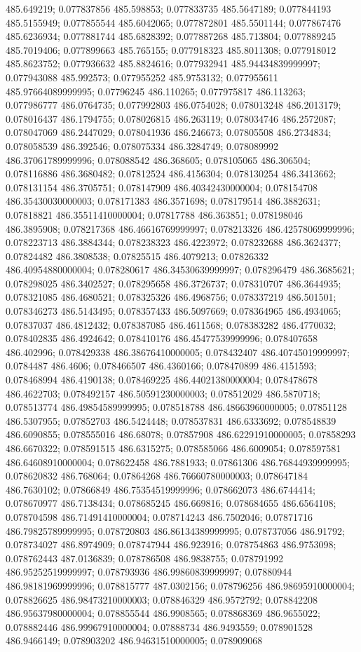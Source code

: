 485.649219; 0.077837856 485.598853; 0.077833735 485.5647189; 0.077844193 485.5155949; 0.077855544 485.6042065; 0.077872801 485.5501144; 0.077867476 485.6236934; 0.077881744 485.6828392; 0.077887268 485.713804; 0.077889245 485.7019406; 0.077899663 485.765155; 0.077918323 485.8011308; 0.077918012 485.8623752; 0.077936632 485.8824616; 0.077932941 485.94434839999997; 0.077943088 485.992573; 0.077955252 485.9753132; 0.077955611 485.97664089999995; 0.07796245 486.110265; 0.077975817 486.113263; 0.077986777 486.0764735; 0.077992803 486.0754028; 0.078013248 486.2013179; 0.078016437 486.1794755; 0.078026815 486.263119; 0.078034746 486.2572087; 0.078047069 486.2447029; 0.078041936 486.246673; 0.07805508 486.2734834; 0.078058539 486.392546; 0.078075334 486.3284749; 0.078089992 486.37061789999996; 0.078088542 486.368605; 0.078105065 486.306504; 0.078116886 486.3680482; 0.07812524 486.4156304; 0.078130254 486.3413662; 0.078131154 486.3705751; 0.078147909 486.40342430000004; 0.078154708 486.35430030000003; 0.078171383 486.3571698; 0.078179514 486.3882631; 0.07818821 486.35511410000004; 0.07817788 486.363851; 0.078198046 486.3895908; 0.078217368 486.46616769999997; 0.078213326 486.42578069999996; 0.078223713 486.3884344; 0.078238323 486.4223972; 0.078232688 486.3624377; 0.07824482 486.3808538; 0.07825515 486.4079213; 0.07826332 486.40954880000004; 0.078280617 486.34530639999997; 0.078296479 486.3685621; 0.078298025 486.3402527; 0.078295658 486.3726737; 0.078310707 486.3644935; 0.078321085 486.4680521; 0.078325326 486.4968756; 0.078337219 486.501501; 0.078346273 486.5143495; 0.078357433 486.5097669; 0.078364965 486.4934065; 0.07837037 486.4812432; 0.078387085 486.4611568; 0.078383282 486.4770032; 0.078402835 486.4924642; 0.078410176 486.45477539999996; 0.078407658 486.402996; 0.078429338 486.38676410000005; 0.078432407 486.40745019999997; 0.0784487 486.4606; 0.078466507 486.4360166; 0.078470899 486.4151593; 0.078468994 486.4190138; 0.078469225 486.44021380000004; 0.078478678 486.4622703; 0.078492157 486.50591230000003; 0.078512029 486.5870718; 0.078513774 486.49854589999995; 0.078518788 486.48663960000005; 0.07851128 486.5307955; 0.07852703 486.5424448; 0.078537831 486.6333692; 0.078548839 486.6090855; 0.078555016 486.68078; 0.07857908 486.62291910000005; 0.07858293 486.6670322; 0.078591515 486.6315275; 0.078585066 486.6009054; 0.078597581 486.64608910000004; 0.078622458 486.7881933; 0.07861306 486.76844939999995; 0.078620832 486.768064; 0.07864268 486.76660780000003; 0.078647184 486.7630102; 0.07866849 486.75354519999996; 0.078662073 486.6744414; 0.078670977 486.7138434; 0.078685245 486.669816; 0.078684655 486.6564108; 0.078704598 486.71491410000004; 0.078714243 486.7502046; 0.07871716 486.79825789999995; 0.078720803 486.86134389999995; 0.078737056 486.91792; 0.078734027 486.8974909; 0.078747944 486.923916; 0.078754863 486.9753098; 0.078762443 487.0136839; 0.078786508 486.9838755; 0.078791992 486.95252519999997; 0.078793936 486.99860839999997; 0.07880944 486.98181969999996; 0.078815777 487.0302156; 0.078796256 486.98695910000004; 0.078826625 486.98473210000003; 0.078846329 486.9572792; 0.078842208 486.95637980000004; 0.078855544 486.9908565; 0.078868369 486.9655022; 0.078882446 486.99967910000004; 0.07888734 486.9493559; 0.078901528 486.9466149; 0.078903202 486.94631510000005; 0.078909068 